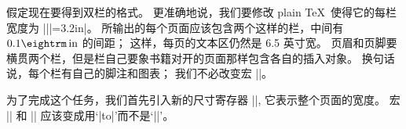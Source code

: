 \ddanger \1假定现在要得到双栏的格式。%
更准确地说，我们要修改 plain \TeX\ 使得它的每栏宽度为 |\hsize||=3.2in|。%
所输出的每个页面应该包含两个这样的栏，中间有 $0.1\rm\,in$ 的间距；
这样，每页的文本区仍然是 6.5 英寸宽。%
页眉和页脚要横贯两个栏，但是栏自己要象书籍对开的页面那样包含各自的插入对象。%
换句话说，每个栏有自己的脚注和图表；
我们不必改变宏 |\pagebody|。

\ddanger 为了完成这个任务，我们首先引入新的尺寸寄存器 |\fullhsize|,
它表示整个页面的宽度。
\begintt
\newdimen\fullhsize
\fullhsize=6.5in \hsize=3.2in
\def\fullline{\hbox to\fullhsize}
\endtt
宏 |\makeheadline| 和 |\makefootline| 应该变成用`|\fullline|'而不是`|\line|'。

